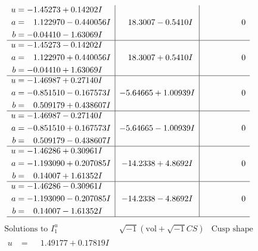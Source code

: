\documentclass[1p]{elsarticle_modified}
\theoremstyle{definition}
\newcommand{\I}{\sqrt{-1}}
\begin{document}
$$\begin{array}{c|c|c}
\begin{aligned}
u &= -1.45273 + 0.14202 I \\
a &= \phantom{-}1.122970 - 0.440056 I \\
b &= -0.04410 - 1.63069 I\end{aligned}
 & \phantom{-}18.3007 - 0.5410 I & \phantom{-0.000000 } 0 \\ \hline\begin{aligned}
u &= -1.45273 - 0.14202 I \\
a &= \phantom{-}1.122970 + 0.440056 I \\
b &= -0.04410 + 1.63069 I\end{aligned}
 & \phantom{-}18.3007 + 0.5410 I & \phantom{-0.000000 } 0 \\ \hline\begin{aligned}
u &= -1.46987 + 0.27140 I \\
a &= -0.851510 - 0.167573 I \\
b &= \phantom{-}0.509179 + 0.438607 I\end{aligned}
 & -5.64665 + 1.00939 I & \phantom{-0.000000 } 0 \\ \hline\begin{aligned}
u &= -1.46987 - 0.27140 I \\
a &= -0.851510 + 0.167573 I \\
b &= \phantom{-}0.509179 - 0.438607 I\end{aligned}
 & -5.64665 - 1.00939 I & \phantom{-0.000000 } 0 \\ \hline\begin{aligned}
u &= -1.46286 + 0.30961 I \\
a &= -1.193090 + 0.207085 I \\
b &= \phantom{-}0.14007 + 1.61352 I\end{aligned}
 & -14.2338 + 4.8692 I & \phantom{-0.000000 } 0 \\ \hline\begin{aligned}
u &= -1.46286 - 0.30961 I \\
a &= -1.193090 - 0.207085 I \\
b &= \phantom{-}0.14007 - 1.61352 I\end{aligned}
 & -14.2338 - 4.8692 I & \phantom{-0.000000 } 0\\
 \hline 
 \end{array}$$\newpage$$\begin{array}{c|c|c}  
\text{Solutions to }I^u_{1}& \I (\text{vol} + \sqrt{-1}CS) & \text{Cusp shape}\\
 \hline 
\begin{aligned}
u &= \phantom{-}1.49177 + 0.17819 I \\

\end{aligned}
\end{array}$$
\end{document}
